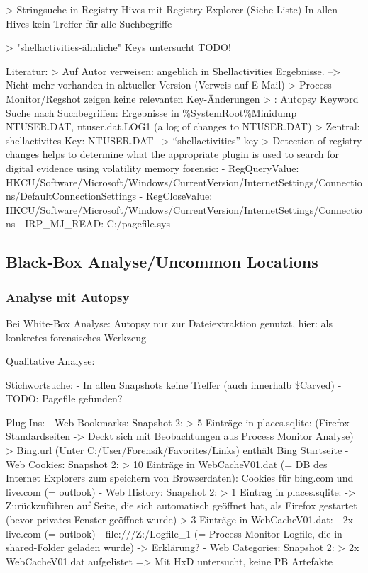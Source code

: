 > Stringsuche in Registry Hives mit Registry Explorer (Siehe Liste)
	In allen Hives kein Treffer für alle Suchbegriffe

> "shellactivities-ähnliche" Keys untersucht
	TODO!
	
Literatur:
	>	Auf Autor verweisen: angeblich in Shellactivities Ergebnisse. --> Nicht mehr vorhanden in aktueller Version (Verweis auf E-Mail)
	>	Process Monitor/Regshot zeigen keine relevanten Key-Änderungen
	> \cite{Muir.2019}: Autopsy Keyword Suche nach Suchbegriffen: Ergebnisse in \%SystemRoot\%Minidump NTUSER.DAT, ntuser.dat.LOG1 (a log of changes to NTUSER.DAT)
	> Zentral: shellactivites Key:	NTUSER.DAT --> “shellactivities” key \cite{Muir.2019}
	> \cite{Rochmadi.2017} Detection of registry changes helps to determine what the appropriate plugin is used to search for digital evidence using volatility memory forensic:
	- RegQueryValue:	HKCU/Software/Microsoft/Windows/CurrentVersion/InternetSettings/Connections/DefaultConnectionSettings
	- RegCloseValue: 	HKCU/Software/Microsoft/Windows/CurrentVersion/InternetSettings/Connections
	- IRP\_MJ\_READ: C:/pagefile.sys


\subsection*{Black-Box Analyse/Uncommon Locations}

\subsubsection*{Analyse mit Autopsy}
Bei White-Box Analyse: Autopsy nur zur Dateiextraktion genutzt, hier: als konkretes forensisches Werkzeug

Qualitative Analyse:

Stichwortsuche:
- In allen Snapshots keine Treffer (auch innerhalb \$Carved)
- TODO: Pagefile gefunden?

Plug-Ins:
- Web Bookmarks:
	Snapshot 2:
		> 5 Einträge in places.sqlite: (Firefox Standardseiten -> Deckt sich mit Beobachtungen aus Process Monitor Analyse)
		> Bing.url (Unter C:/User/Forensik/Favorites/Links) enthält Bing Startseite
- Web Cookies:
	Snapshot 2:
		> 10 Einträge in WebCacheV01.dat (= DB des Internet Explorers zum speichern von Browserdaten): Cookies für bing.com und live.com (= outlook)
- Web History:
	Snapshot 2:
		> 1 Eintrag in places.sqlite: %
			-> Zurückzuführen auf Seite, die sich automatisch geöffnet hat, als Firefox gestartet (bevor privates Fenster geöffnet wurde)
		> 3 Einträge in WebCacheV01.dat:
			- 2x live.com (= outlook)
			- file:///Z:/Logfile\_1 (= Process Monitor Logfile, die in shared-Folder geladen wurde) -> Erklärung?
- Web Categories:
	Snapshot 2:
		> 2x WebCacheV01.dat aufgelistet => Mit HxD untersucht, keine PB Artefakte

